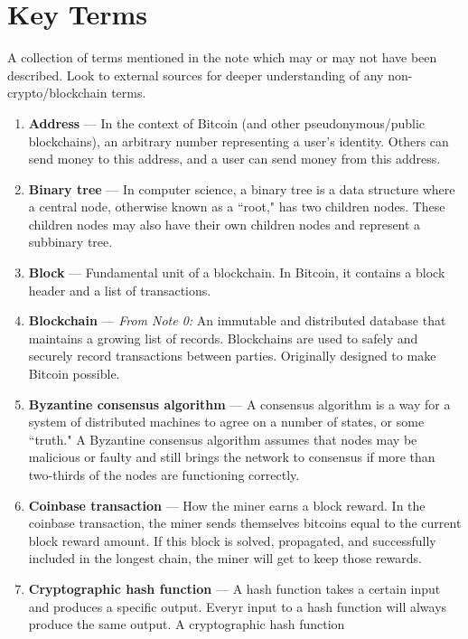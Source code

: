 \documentclass[11pt]{article}
\begin{document}
    
    
    \newpage
    \thispagestyle{firstpage}
    \vspace*{2\baselineskip}
    \section*{Key Terms}
    \noindent A collection of terms mentioned in the note which may or may not have been described. Look to external sources for deeper understanding of any non-crypto/blockchain terms.
    \begin{enumerate}
        \item \textbf{Address} --- In the context of Bitcoin (and other pseudonymous/public blockchains), an arbitrary number representing a user's identity. Others can send money to this address, and a user can send money from this address.
        \item \textbf{Binary tree} --- In computer science, a binary tree is a data structure where a central node, otherwise known as a ``root," has two children nodes. These children nodes may also have their own children nodes and represent a subbinary tree. 
        \item \textbf{Block} --- Fundamental unit of a blockchain. In Bitcoin, it contains a block header and a list of transactions.
        \item \textbf{Blockchain} --- \textit{From Note 0:} An immutable and distributed database that maintains a growing list of records. Blockchains are used to safely and securely record transactions between parties. Originally designed to make Bitcoin possible.
        \item \textbf{Byzantine consensus algorithm} --- A consensus algorithm is a way for a system of distributed machines to agree on a number of states, or some ``truth." A Byzantine consensus algorithm assumes that nodes may be malicious or faulty and still brings the network to consensus if more than two-thirds of the nodes are functioning correctly.
        \item \textbf{Coinbase transaction} --- How the miner earns a block reward. In the coinbase transaction, the miner sends themselves bitcoins equal to the current block reward amount. If this block is solved, propagated, and successfully included in the longest chain, the miner will get to keep those rewards.
        \item \textbf{Cryptographic hash function} --- A hash function takes a certain input and produces a specific output. Everyr input to a hash function will always produce the same output. A cryptographic hash function

\end{enumerate}
\end{document}
